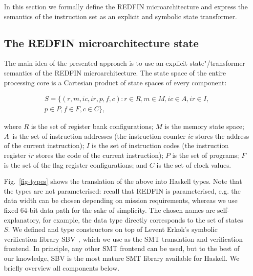 
In this section we formally define the REDFIN microarchitecture and express the
semantics of the instruction set as an explicit and symbolic state transformer.


\subsection{The REDFIN microarchitecture state}


The main idea of the presented approach is to use an explicit state"/transformer
semantics of the REDFIN microarchitecture. The state space of the entire
processing core is a Cartesian product of state spaces of every component:

\begin{equation}
\begin{split}
S=\{(r, m, ic, ir, p, f, c) : r \in R, m \in M, ic \in A, ir \in I,\\
p \in P, f \in F, c \in C\},
\end{split}
\end{equation}

\noindent
where $R$ is the set of register bank configurations;
$M$ is the memory state space;
$A$~is the set of instruction addresses (the instruction counter $ic$ stores the
address of the current instruction);
$I$ is the set of instruction codes (the instruction register $ir$ stores the
code of the current instruction);
$P$ is the set of programs;
$F$ is the set of the flag register configurations; and
$C$ is the set of clock values.

Fig.~\ref{fig-types} shows the translation of the above into Haskell types. Note
that the types are not parameterised: recall that REDFIN is parameterised, e.g.
the data width can be chosen depending on mission requirements, whereas we use fixed
64-bit data path for the sake of simplicity. The chosen names are self-explanatory,
for example, the data type  directly corresponds to the set of states~$S$.
We defined  and  type constructors on top of
Levent Erkok's symbolic verification library SBV~\cite{SBV}, which we use as the
SMT translation and verification frontend. In principle, any other SMT frontend
can be used, but to the best of our knowledge, SBV is the most mature SMT library
available for Haskell. We briefly overview all  components below.

